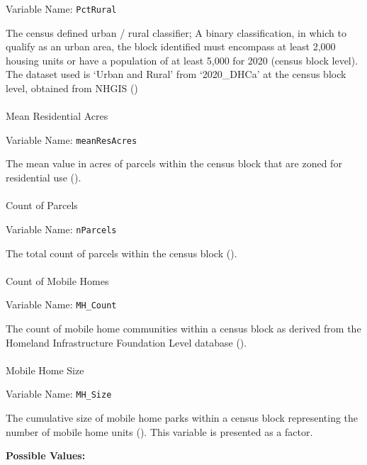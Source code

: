 \documentclass[12pt]{article}
\makeatletter
\let\oldparagraph\paragraph
\renewcommand{\paragraph}{
    \@ifstar
      \xxxParagraphStar
      \xxxParagraphNoStar
  }
\newcommand{\xxxParagraphStar}[1]{\oldparagraph*{#1}\mbox{}}
\newcommand{\xxxParagraphNoStar}[1]{\oldparagraph{#1}\mbox{}}
\makeatother
\begin{document}
Variable Name: \texttt{PctRural}

The census defined urban / rural classifier; A binary classification, in
which to qualify as an urban area, the block identified must encompass
at least 2,000 housing units or have a population of at least 5,000 for
2020 (census block level). The dataset used is `Urban and Rural' from
`2020\_DHCa' at the census block level, obtained from NHGIS
()

\paragraph{Mean Residential Acres}\label{mean-residential-acres}

Variable Name: \texttt{meanResAcres}

The mean value in acres of parcels within the census block that are
zoned for residential use ().

\paragraph{Count of Parcels}\label{count-of-parcels}

Variable Name: \texttt{nParcels}

The total count of parcels within the census block
().

\paragraph{Count of Mobile Homes}\label{count-of-mobile-homes}

Variable Name: \texttt{MH\_Count}

The count of mobile home communities within a census block as derived
from the Homeland Infrastructure Foundation Level database
().

\paragraph{Mobile Home Size}\label{mobile-home-size}

Variable Name: \texttt{MH\_Size}

The cumulative size of mobile home parks within a census block
representing the number of mobile home units (). This variable is presented as a factor.

\textbf{Possible Values:}
\end{document}
